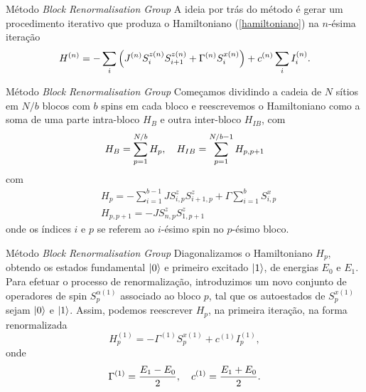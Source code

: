 \documentclass[brazil]{beamer}
\begin{document}
\begin{frame}{Método \textit{Block Renormalisation Group}}
    A ideia por trás do método é gerar um procedimento iterativo que produza o Hamiltoniano (\ref{hamiltoniano}) na \( n \)-ésima iteração
    \begin{equation}
        H^{(n)} = - \sum_i \qty( J^{(n)} S_i^{z (n)} S_{i + 1}^{z (n)} + \Gamma^{(n)} S_i^{x (n)} ) + c^{(n)} \sum_i I_i^{(n)} .
    \end{equation}
\end{frame}

\begin{frame}{Método \textit{Block Renormalisation Group}}
    Começamos dividindo a cadeia de \( N \) sítios em \( N / b \) blocos com \( b \) spins em cada bloco e reescrevemos o Hamiltoniano como a soma de uma parte intra-bloco \( H_B \) e outra inter-bloco \( H_{IB} \), com
    \begin{equation}
        H_B = \sum_{p = 1}^{N / b} H_p \qc H_{IB} = \sum_{p = 1}^{N / b - 1} H_{p, p + 1}
    \end{equation}
    com
    \begin{align}
        & H_p = - \sum_{i = 1}^{b - 1} J S_{i, p}^z S_{i + 1, p}^z + \Gamma \sum_{i = 1}^b S_{i, p}^x \\
        & H_{p, p + 1} = - J S_{n, p}^z S_{1, p + 1}^z 
    \end{align}
    onde os índices \( i \) e \( p \) se referem ao \( i \)-ésimo spin no \( p \)-ésimo bloco.
\end{frame}

\begin{frame}{Método \textit{Block Renormalisation Group}}
    Diagonalizamos o Hamiltoniano \( H_p \), obtendo os estados fundamental \( \ket{0} \) e primeiro excitado \( \ket{1} \), de energias \( E_0 \) e \( E_1 \).
    Para efetuar o processo de renormalização, introduzimos um novo conjunto de operadores de spin \( S_p^{\alpha (1)} \) associado ao bloco \( p \), tal que os autoestados de \( S_p^{x (1)} \) sejam \( \ket{0} \) e \( \ket{1} \).
    Assim, podemos reescrever \( H_p \), na primeira iteração, na forma renormalizada
    \begin{equation}
        H_p^{(1)} = - \Gamma^{(1)} S_p^{x (1)} + c^{(1)} I_p^{(1)} ,
    \end{equation}
    onde
    \begin{equation}
        \Gamma^{(1)} = \frac{E_1 - E_0}{2} \qc c^{(1)} = \frac{E_1 + E_0}{2} .
    \end{equation}
\end{frame}
\end{document}
